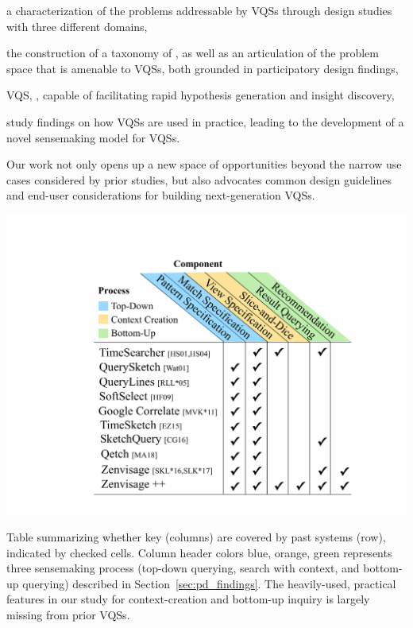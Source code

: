 \begin{denselist}
\item a characterization of the problems addressable by VQSs through design studies with three different domains,
\item the construction of a taxonomy of , as well as an articulation of the problem space that is amenable to VQSs, both grounded in participatory design findings,
\item {} VQS, \zvpp,  capable of facilitating rapid hypothesis generation and insight discovery,
\item study findings on how VQSs are used in practice, leading to the development of a novel sensemaking model for VQSs. %
\end{denselist}
Our work not only opens up a new space of opportunities beyond the narrow use cases considered by prior studies, but also advocates common design guidelines and end-user considerations for building next-generation VQSs.
\begin{table}[h!]
    \centering
    \includegraphics[width=0.8\linewidth]{figures/related_works_table.pdf}
    \caption{Table summarizing whether key  (columns) are covered by past systems (row), indicated by checked cells. Column header colors blue, orange, green represents three sensemaking process (top-down querying, search with context, and bottom-up querying) described in Section~\ref{sec:pd_findings}. The heavily-used, practical features in our study for context-creation and bottom-up inquiry is largely missing from prior VQSs.}
    \label{table:relatedwork}
    \vspace{-10pt}
\end{table}
